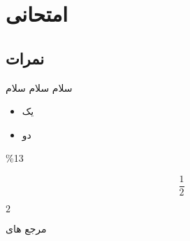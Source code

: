 \chapter{امتحانی}
\section{نمرات}
سلام سلام سلام%
\begin{itemize}
	\item یک
	\item دو
\end{itemize}

\%13 

\begin{equation}
\frac{1}{2}
\end{equation}

$2$

مرجع های 
\cite{Amintoosi09regional,Baker02limits}

